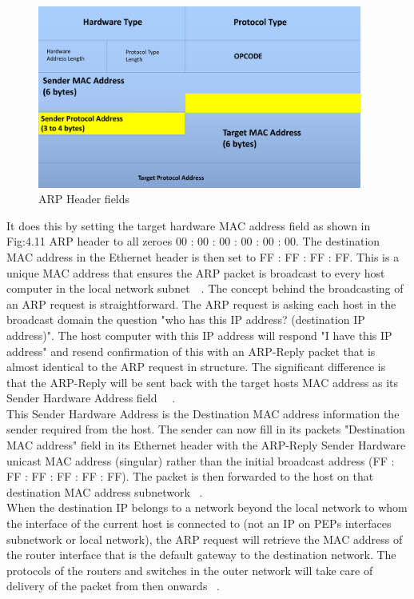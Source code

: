 \begin{figure}[h!]
    \centering
    \includegraphics[width=0.95\textwidth]{ArpHeaders.pdf}
    \caption{ARP Header fields}
    \label{ARPHeader}
\end{figure}

It does this by setting the target hardware MAC address field as shown in Fig:4.11 ARP header to all zeroes 00 : 00 : 00 : 00 : 00 : 00. The destination MAC address in the Ethernet header is then set to FF : FF : FF : FF. This is a unique MAC address that ensures the ARP packet is broadcast to every host computer in the local network subnet~\cite{1}~\cite{2}. The concept behind the broadcasting of an ARP request is straightforward. The ARP request is asking each host in the broadcast domain the question "who has this IP address? (destination IP address)". The host computer with this IP address will respond "I have this IP address" and resend confirmation of this with an ARP-Reply packet that is almost identical to the ARP request in structure. The significant difference is that the ARP-Reply will be sent back with the target hosts MAC address as its Sender Hardware Address field ~\cite{1}~\cite{2}. \\

This  Sender Hardware Address is the Destination MAC address information the sender required from the host. The sender can now fill in its packets "Destination MAC address" field in its Ethernet header with the ARP-Reply  Sender Hardware unicast MAC address (singular) rather than the initial broadcast address (FF : FF : FF : FF : FF : FF). The packet is then forwarded to the host on that destination MAC address subnetwork ~\cite{1}. \\

When the destination IP belongs to a network beyond the local network to whom the interface of the current host is connected to  (not an IP on PEPs interfaces subnetwork or local network), the ARP request will retrieve the MAC address of the router interface that is the default gateway to the destination network. The protocols of the routers and switches in the outer network will take care of delivery of the packet from then onwards ~\cite{1}.

